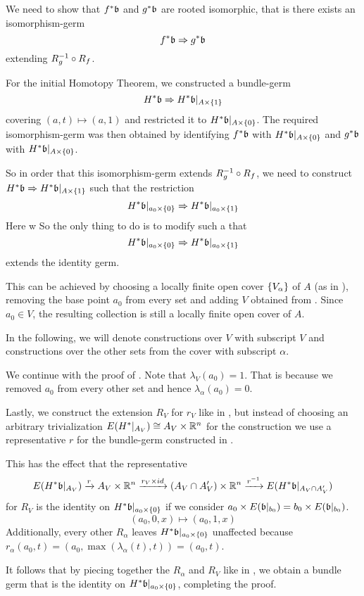 \begin{myproof}
    We need to show that $\ind{f}\bb$ and $\ind{g}\bb$ are rooted isomorphic,
    that is there exists an isomorphism-germ
    \[ \germ{\ind{f}\bb}{\ind{g}\bb} \]
    extending $R_g^{-1} \circ R_f$.

    For the initial Homotopy Theorem,
    we constructed a bundle-germ
    \[ \germ{\ind{H}\bb}{\ind{H}\bb[\cylup{A}]} \]
    covering $(a, t) \mapsto (a, 1)$
    and restricted it to $\ind{H}\bb[\cyldown{A}]$.
    The required isomorphism-germ was then obtained by
    identifying $\ind{f}\bb$ with $\ind{H}\bb[\cyldown{A}]$ and
    $\ind{g}\bb$ with $\ind{H}\bb[\cyldown{A}]$.

    So in order that this isomorphism-germ extends $R_g^{-1} \circ R_f$,
    we need to construct $\germ{\ind{H}\bb}{\ind{H}\bb[\cylup{A}]}$ such that
    the restriction
    \[ \germ{\ind{H}\bb[\cyldown{a_0}]}{\ind{H}\bb[\cylup{a_0}]} \]
    Here w
    So the only thing to do is to modify  such a that
    \[ \germ{\ind{H}\bb[\cyldown{a_0}]}{\ind{H}\bb[\cylup{a_0}]} \]
    extends the identity germ.

    This can be achieved by choosing a locally finite open cover $\{V_\alpha\}$
    of $A$ (as in ), removing the base point $a_0$ from every set
    and adding $V$ obtained from .
    Since $a_0 \in V$, the resulting collection is still a
    locally finite open cover of $A$.
    
    In the following, we will denote constructions over $V$
    with subscript $V$ and constructions over the other sets
    from the cover with subscript $\alpha$.

    We continue with the proof of .
    Note that $\lambda_V(a_0) = 1$.
    That is because we removed $a_0$ from every other set and hence $\lambda_\alpha(a_0) = 0$.

    Lastly, we construct the extension $R_V$ for $r_V$
    like in ,
    but instead of choosing an arbitrary trivialization
    $E(H^*\vert_{A_V}) \cong A_V \times \mathbb{R}^n$
    for the construction we use a representative $r$
    for the bundle-germ constructed in .
    
    This has the effect that the representative
    \[
        E(\ind{H}\bb[A_V]) \xto{r}
        A_V \cross \R^n \xto{r_V \cross id} (A_V \cap A'_V) \cross \R^n
        \xto{\inv{r}} E(\ind{H}\bb[A_V \cap A'_V])
    \]
    for $R_V$ is the identity on $\ind{H}\bb[\cyldown{a_0}]$ if we consider $a_0 \cross E(\bbb) = b_0 \cross E(\bbb)$.
    \[ (a_0, 0, x) \mapsto (a_0, 1, x) \]
    Additionally,
    every other $R_\alpha$ leaves $\ind{H}\bb[\cyldown{a_0}]$ unaffected
    because $r_\alpha(a_0, t) = (a_0, \max(\lambda_\alpha(t), t)) = (a_0, t)$.

    It follows that by piecing together the $R_\alpha$ and $R_V$ like in ,
    we obtain a bundle germ that is the identity on $\ind{H}\bb[\cyldown{a_0}]$,
    completing the proof.
\end{myproof}